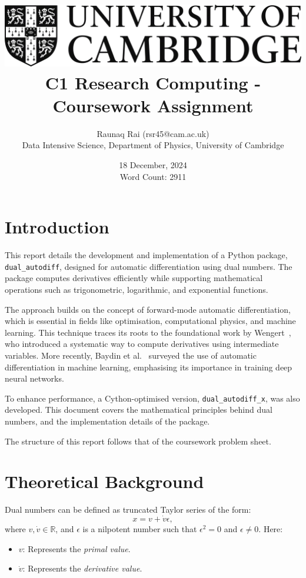 \documentclass[a4paper,12pt]{article}
\title{
    \includegraphics[scale=0.4]{Cam_logo_bw.png}\\
    \vspace{0.5cm}
    C1 Research Computing - Coursework Assignment
}
\author{Raunaq Rai (rsr45@cam.ac.uk)\\
    Data Intensive Science, Department of Physics, University of Cambridge
}
\date{18 December, 2024 \\ \vspace{0.2cm} {\small Word Count: 2911}}
\begin{document}
\maketitle

\section*{Introduction}
This report details the development and implementation of a Python package, \texttt{dual\_autodiff}, designed for automatic differentiation using dual numbers. The package computes derivatives efficiently while supporting mathematical operations such as trigonometric, logarithmic, and exponential functions.

The approach builds on the concept of forward-mode automatic differentiation, which is essential in fields like optimisation, computational physics, and machine learning. This technique traces its roots to the foundational work by Wengert~\cite{wengert1964automatic}, who introduced a systematic way to compute derivatives using intermediate variables. More recently, Baydin et al.~\cite{baydin2018automatic} surveyed the use of automatic differentiation in machine learning, emphasising its importance in training deep neural networks.

To enhance performance, a Cython-optimised version, \texttt{dual\_autodiff\_x}, was also developed. This document covers the mathematical principles behind dual numbers, and the implementation details of the package.

The structure of this report follows that of the coursework problem sheet.

\section*{Theoretical Background}

Dual numbers can be defined as truncated Taylor series of the form:
\begin{equation}
    x = v + \dot{v}\epsilon,
    \label{eq:dual_number_form}
    \end{equation}
where \(v, \dot{v} \in \mathbb{R}\), and \(\epsilon\) is a nilpotent number such that \(\epsilon^2 = 0\) and \(\epsilon \neq 0\). Here:
\begin{itemize}
    \item \(v\): Represents the \textit{primal value}.
    \item \(\dot{v}\): Represents the \textit{derivative value}.
\end{itemize}
\end{document}
